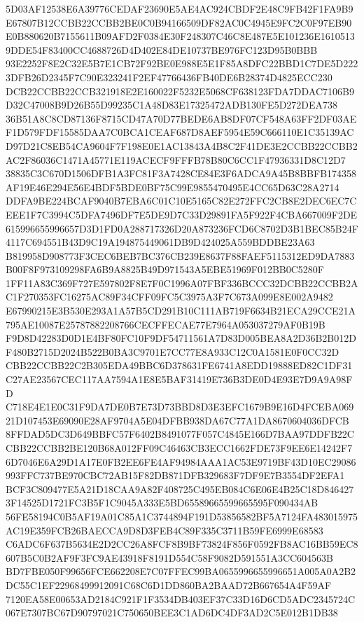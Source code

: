\documentclass[UTF8,fontset=fandol,zihao=-4,a4paper]{ctexart}
\begin{document}
{{5D03AF12538E6A39776CEDAF23690E5AE4AC924CBDF2E48C9FB42F1FA9B9E67807B12CCBB22CCBB2BE0C0B94166509DF82AC0C4945E9FC2C0F97EB90
E0B880620B7155611B09AFD2F0384E30F248307C46C8E487E5E101236E16105139DDE54F83400CC4688726D4D402E84DE10737BE976FC123D95B0BBB
93E2252F8E2C32E5B7E1CB72F92BE0E988E5E1F85A8DFC22BBD1C7DE5D2223DFB26D2345F7C90E323241F2EF47766436FB40DE6B28374D4825ECC230
DCB22CCBB22CCB321918E2E160022F5232E5068CF638123FDA7DDAC7106B9D32C47008B9D26B55D99235C1A48D83E17325472ADB130FE5D272DEA738
36B51A8C8CD87136F8715CD47A70D77BEDE6AB8DF07CF548A63FF2DF03AEF1D579FDF15585DAA7C0BCA1CEAF687D8AEF5954E59C666110E1C35139AC
D97D21C8EB54CA9604F7F198E0E1AC13843A4B8C2F41DE3E2CCBB22CCBB2AC2F86036C1471A45771E119ACECF9FFFB78B80C6CC1F47936331D8C12D7
38835C3C670D1506DFB1A3FC81F3A7428CE84E3F6ADCA9A45B8BBFB174358AF19E46E294E56E4BDF5BDE0BF75C99E9855470495E4CC65D63C28A2714
DDFA9BE224BCAF9040B7EBA6C01C10E5165C82E272FFC2CB8E2DEC6EC7CEEE1F7C3994C5DFA7496DF7E5DE9D7C33D29891FA5F922F4CBA667009F2DE
615996655996657D3D1FD0A288717326D20A873236FCD6C8702D3B1BEC85B24F4117C694551B43D9C19A194875449061DB9D424025A559BDDBE23A63
B819958D908773F3CEC6BEB7BC376CB239E8637F88FAEF5115312ED9DA7883B00F8F973109298FA6B9A8825B49D971543A5EBE51969F012BB0C5280F
1FF11A83C369F727E597802F8E7F0C1996A07FBF336BCCC32DCBB22CCBB2AC1F270353FC16275AC89F34CFF09FC5C3975A3F7C673A099E8E002A9482
E67990215E3B530E293A1A57B5CD291B10C111AB719F6634B21ECA29CCE21A795AE10087E25787882208766CECFFECAE77E7964A053037279AF0B19B
F9D8D42283D0D1E4BF80FC10F9DF54711561A7D83D005BEA8A2D36B2B012DF480B2715D2024B522B0BA3C9701E7CC77E8A933C12C0A1581E0F0CC32D
CBB22CCBB22C2B305EDA49BBC6D378631FE6741A8EDD19888ED82C1DF31C27AE23567CEC117AA7594A1E8E5BAF31419E736B3DE0D4E93E7D9A9A98FD
C718E4E1E0C31F9DA7DE0B7E73D73BBD8D3E3EFC1679B9E16D4FCEBA06921D107453E69090E28AF9704A5E04DFBB938DA67C77A1DA8670604036DFCB
8FFDAD5DC3D649BBFC57F6402B8491077F057C4845E166D7BAA97DDFB22CCBB22CCBB2BE120B68A012FF09C46463CB3ECC1662FDE73F9EE6E14242F7
6D7046E6A29D1A17E0FB2EE6FE4AF94984AAA1AC53E9719BF43D10EC29086993FFC737BE970CBC72AB15F82DB871DFB329683F7DF9E7B3554DF2EFA1
BCF3C809477E5A21D18CAA9A82F408725C495EB084C6E06E4B25C18D8464273F14525D1721FC3B5F1C9045A333E5BD65589665599665595F090434AB
56FE58194C0B5AF19A01C85A1C3744894F191D53856582BF5A7124FA483015975AC19E359FCB26BAECCA9D8D3FEB4C89F335C3711B59FE6999E68583
C6ADC6F637B5634E2D2CC26A8FCF8B9BF73824F856F0592FB8AC16BB59EC8607B5C0B2AF9F3FC9AE43918F8191D554C58F9082D591551A3CC604563B
BD7FBE050F99656FCE662208E7C07FFEC99BA0655996655996651A005A0A2B2DC55C1EF22968499912091C68C6D1DD860BA2BAAD72B667654A4F59AF
7120EA58E00653AD2184C921F1F3534DB403EF37C33D16D6CD5ADC2345724C067E7307BC67D90797021C750650BEE3C1AD6DC4DF3AD2C5E012B1DB38
}}
\end{document}
